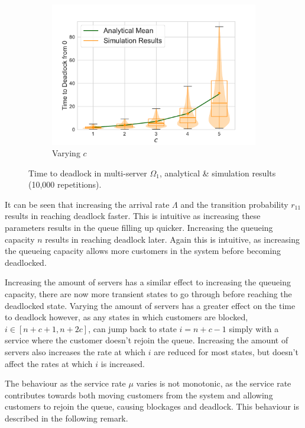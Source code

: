 \documentclass{article}
\numberwithin{equation}{section}
\begin{document}
\begin{figure}[!htbp]
\begin{center}
\begin{subfigure}[b]{0.48\textwidth}
    \includegraphics[width=\textwidth]{images/1Nms_varyc}
    \caption{Varying $c$}
    \label{fig:1Nms_c}
  \end{subfigure}
  \end{center}
  \caption{Time to deadlock in multi-server $\Omega_1$, analytical \&
  simulation results (10,000 repetitions).}
  \label{fig:timestodeadlock1nodemultiserver}
\end{figure}

It can be seen that increasing the arrival rate $\Lambda$ and the transition
probability $r_{11}$ results in reaching deadlock faster.
This is intuitive as increasing these parameters results in the queue filling
up quicker.
Increasing the queueing capacity $n$ results in reaching deadlock later.
Again this is intuitive, as increasing the queueing capacity allows more
customers in the system before becoming deadlocked.

Increasing the amount of servers has a similar effect to increasing the
queueing capacity, there are now more transient states to go through before
reaching the deadlocked state.
Varying the amount of servers has a greater effect on the time to deadlock
however, as any states in which customers are blocked, $i \in [n+c+1, n+2c]$,
can jump back to state $i=n+c-1$ simply with a service where the customer
doesn't rejoin the queue.
Increasing the amount of servers also increases the rate at which $i$ are
reduced for most states, but doesn't affect the rates at which $i$ is
increased.

The behaviour as the service rate $\mu$ varies is not monotonic, as the
service rate contributes towards both moving customers from the system and
allowing customers to rejoin the queue, causing blockages and deadlock.
This behaviour is described in the following remark.\\
\end{document}
